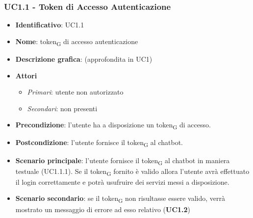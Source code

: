 \subsubsection{UC1.1 - Token di Accesso Autenticazione}
\begin{itemize}
    \item \textbf{Identificativo}: UC1.1
    \item \textbf{Nome}: token\textsubscript{G} di accesso autenticazione
    \item \textbf{Descrizione grafica}: (approfondita in UC1)
    \item \textbf{Attori}
 \begin{itemize} 
    \item \textit{Primari}: utente non autorizzato
    \item \textit{Secondari}: non presenti
 \end{itemize}
 \item \textbf{Precondizione}: l'utente ha a disposizione un token\textsubscript{G} di accesso.
 \item \textbf{Postcondizione}: l'utente fornisce il token\textsubscript{G} al chatbot.
 \item \textbf{Scenario principale}: l'utente fornisce il token\textsubscript{G} al chatbot in maniera testuale (UC1.1.1). Se il token\textsubscript{G} fornito è valido allora l'utente avrà effettuato il login correttamente e potrà usufruire dei servizi messi a disposizione. 
 \item \textbf{Scenario secondario}: se il token\textsubscript{G} non risultasse essere valido, verrà mostrato un messaggio di errore ad esso relativo (\textbf{UC1.2})
\end{itemize}

